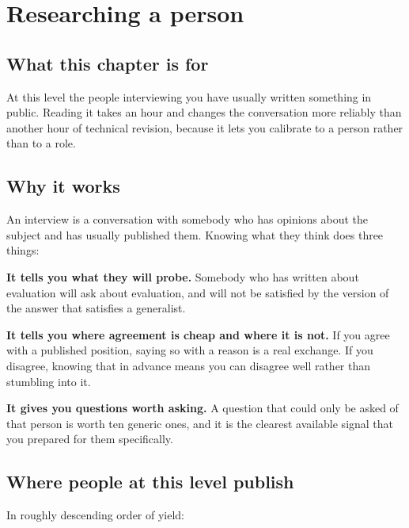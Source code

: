 \chapter{Researching a person}
\label{ch:person}

\section*{What this chapter is for}

At this level the people interviewing you have usually written something in
public. Reading it takes an hour and changes the conversation more reliably
than another hour of technical revision, because it lets you calibrate to a
person rather than to a role.

\section{Why it works}

An interview is a conversation with somebody who has opinions about the subject
and has usually published them. Knowing what they think does three things:

\textbf{It tells you what they will probe.} Somebody who has written about
evaluation will ask about evaluation, and will not be satisfied by the version
of the answer that satisfies a generalist.

\textbf{It tells you where agreement is cheap and where it is not.} If you
agree with a published position, saying so with a reason is a real exchange. If
you disagree, knowing that in advance means you can disagree well rather than
stumbling into it.

\textbf{It gives you questions worth asking.} A question that could only be
asked of that person is worth ten generic ones, and it is the clearest
available signal that you prepared for them specifically.


\section{Where people at this level publish}

In roughly descending order of yield:

